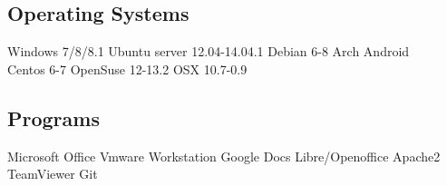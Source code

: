 \documentclass[letterpaper]{deedy-resume} %
\begin{document}
\begin{minipage}[t]{0.31\textwidth}
\sectionspace %

\subsection{Operating Systems}
Windows 7/8/8.1 \textbullet{} Ubuntu server 12.04-14.04.1 \textbullet{} Debian 6-8 \textbullet{} Arch  \textbullet{} Android \\
Centos 6-7   \textbullet{} OpenSuse 12-13.2 \textbullet{}   OSX 10.7-0.9 
\sectionspace %
\subsection{Programs}
 Microsoft Office \textbullet{} Vmware Workstation \textbullet{} Google Docs  \textbullet{} Libre/Openoffice \textbullet{}   Apache2 \textbullet{} TeamViewer \textbullet{} Git \\

\sectionspace %

\end{minipage} %
\hfill
\begin{minipage}[t]{0.2\textwidth}
\end{minipage}
%
%
\end{document}
